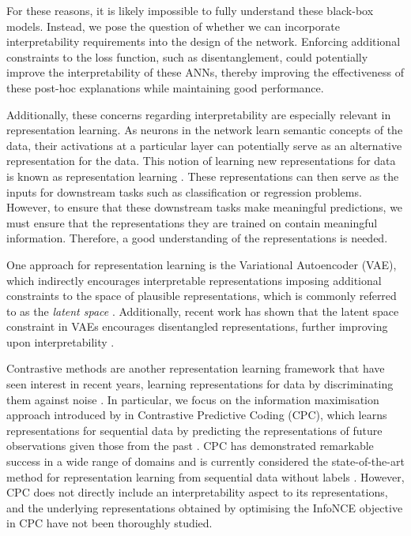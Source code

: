 For these reasons, it is likely impossible to fully understand these black-box models. Instead, we pose the question of whether we can incorporate interpretability requirements into the design of the network. Enforcing additional constraints to the loss function, such as disentanglement, could potentially improve the interpretability of these ANNs, thereby improving the effectiveness of these post-hoc explanations while maintaining good performance.


Additionally, these concerns regarding interpretability are especially relevant in representation learning. As neurons in the network learn semantic concepts of the data, their activations at a particular layer can potentially serve as an alternative representation for the data. This notion of learning new representations for data is known as representation learning \citep{le-khacContrastiveRepresentationLearning2020}. These representations can then serve as the inputs for downstream tasks such as classification or regression problems. However, to ensure that these downstream tasks make meaningful predictions, we must ensure that the representations they are trained on contain meaningful information. Therefore, a good understanding of the representations is needed.


One approach for representation learning is the Variational Autoencoder (VAE), which indirectly encourages interpretable representations imposing additional constraints to the space of plausible representations, which is commonly referred to as the \textit{latent space} \citep{kingmaAutoEncodingVariationalBayes2022}. Additionally, recent work has shown that the latent space constraint in VAEs encourages disentangled representations, further improving upon interpretability \citep{burgessUnderstandingDisentanglingBeta2018, sikkaCloserLookDisentangling2019, higginsBetaVAELearningBasic2022}.

Contrastive methods are another representation learning framework that have seen interest in recent years, learning representations for data by discriminating them against noise \citep{chenSimpleFrameworkContrastive2020}. In particular, we focus on the information maximisation approach introduced by \cite{oordRepresentationLearningContrastive2019} in Contrastive Predictive Coding (CPC), which learns representations for sequential data by predicting the representations of future observations given those from the past \cite{henaffDataEfficientImageRecognition2020}. CPC has demonstrated remarkable success in a wide range of domains and is currently considered the state-of-the-art method for representation learning from sequential data without labels \citep{stackeEvaluationContrastivePredictive2020, dehaanContrastivePredictiveCoding2021, luSemiSupervisedHistologyClassification2019, bhatiSegmentalContrastivePredictive2021, deldariTimeSeriesChange2021, henaffDataEfficientImageRecognition2020}. However, CPC does not directly include an interpretability aspect to its representations, and the underlying representations obtained by optimising the InfoNCE objective in CPC have not been thoroughly studied.



